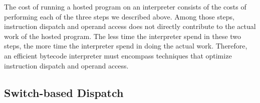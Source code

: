The cost of running a hosted program on an interpreter consists of the costs of performing each of the three steps we described above.
Among those steps, instruction dispatch and operand access does not directly contribute to the actual work of the hosted program.
The less time the interpreter spend in these two steps, the more time the interpreter spend in doing the actual work.
Therefore, an efficient bytecode interpreter must encompass techniques that optimize instruction dispatch and operand access.

\subsection{Switch-based Dispatch}

\begin{figure}[th]
\centering
{}
\end{figure}
